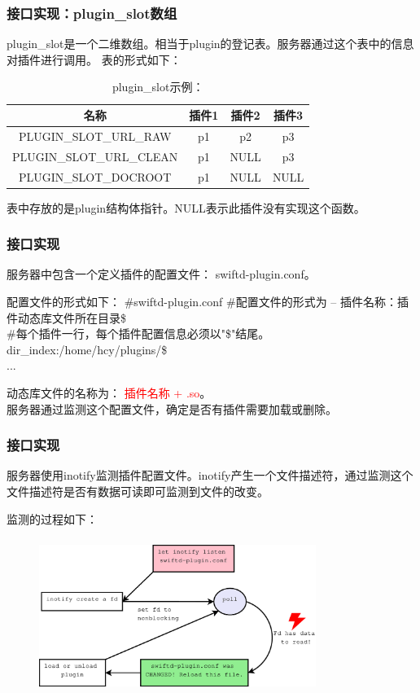 \documentclass[10pt,dvipdfm]{beamer}
\begin{document}
\begin{frame}
	\frametitle{接口实现：plugin\_slot数组}
	plugin\_slot是一个二维数组。相当于plugin的登记表。服务器通过这个表中的信息对插件进行调用。
	表的形式如下：
	\begin{table}[htbp]
	\caption{plugin\_slot示例：}
	\centering
	\begin{tabular}{cccc} %
	\toprule
	\centering 名称 & 插件1 & 插件2 &插件3\\
	\midrule
	\centering PLUGIN\_SLOT\_URL\_RAW & p1 &  p2 & p3\\
	\centering PLUGIN\_SLOT\_URL\_CLEAN &  p1 &  NULL & p3\\
	\centering PLUGIN\_SLOT\_DOCROOT & p1 & NULL & NULL\\
	\bottomrule
	\end{tabular}
	\end{table}
	\begin{block}{}
		表中存放的是plugin结构体指针。NULL表示此插件没有实现这个函数。
	\end{block}
\end{frame}

\begin{frame}
	\frametitle{接口实现}
	服务器中包含一个定义插件的配置文件： swiftd-plugin.conf。
	
	\begin{block}{配置文件的形式如下：}	
		\#swiftd-plugin.conf
		\#配置文件的形式为  -- 插件名称：插件动态库文件所在目录\$\\
		\#每个插件一行，每个插件配置信息必须以"\$"结尾。\\
		dir\_index:/home/hcy/plugins/\$\\
		...
	\end{block}
	
	\pause
	
	\begin{block}{}
	动态库文件的名称为： \textcolor{red}{插件名称 + .so}。\\
	服务器通过监测这个配置文件，确定是否有插件需要加载或删除。
	\end{block}
\end{frame}

\begin{frame}
	\frametitle{接口实现}
	服务器使用inotify监测插件配置文件。inotify产生一个文件描述符，通过监测这个文件描述符是否有数据可读即可监测到文件的改变。
	\begin{block}{监测的过程如下：}
	\begin{figure}[htbp]
	\centering
	\includegraphics[height=5cm, width=9cm]{pics/inotify.eps}
	\end{figure}
	\end{block}
\end{frame}
\end{document}
